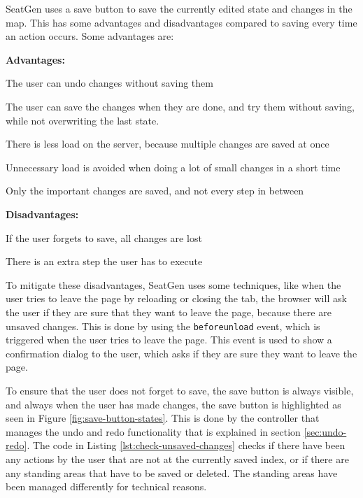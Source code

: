 SeatGen uses a save button to save the currently edited state and changes in the map. This has some advantages and disadvantages compared to saving every time an action occurs. Some advantages are:

\textbf{Advantages:}
\begin{compactitem}
    \item The user can undo changes without saving them
    \item The user can save the changes when they are done, and try them without saving, while not overwriting the last state.
    \item There is less load on the server, because multiple changes are saved at once
    \item Unnecessary load is avoided when doing a lot of small changes in a short time
    \item Only the important changes are saved, and not every step in between
\end{compactitem}

\textbf{Disadvantages:}
\begin{compactitem}
\item If the user forgets to save, all changes are lost
\item There is an extra step the user has to execute
\end{compactitem}

To mitigate these disadvantages, SeatGen uses some techniques, like when the user tries to leave the page by reloading or closing the tab, the browser will ask the user if they are sure that they want to leave the page, because there are unsaved changes. This is done by using the \texttt{beforeunload} event, which is triggered when the user tries to leave the page. This event is used to show a confirmation dialog to the user, which asks if they are sure they want to leave the page.

To ensure that the user does not forget to save, the save button is always visible, and always when the user has made changes, the save button is highlighted as seen in Figure \ref{fig:save-button-states}. This is done by the controller that manages the undo and redo functionality that is explained in section \ref{sec:undo-redo}. The code in Listing \ref{lst:check-unsaved-changes} checks if there have been any actions by the user that are not at the currently saved index, or if there are any standing areas that have to be saved or deleted. The standing areas have been managed differently for technical reasons.

